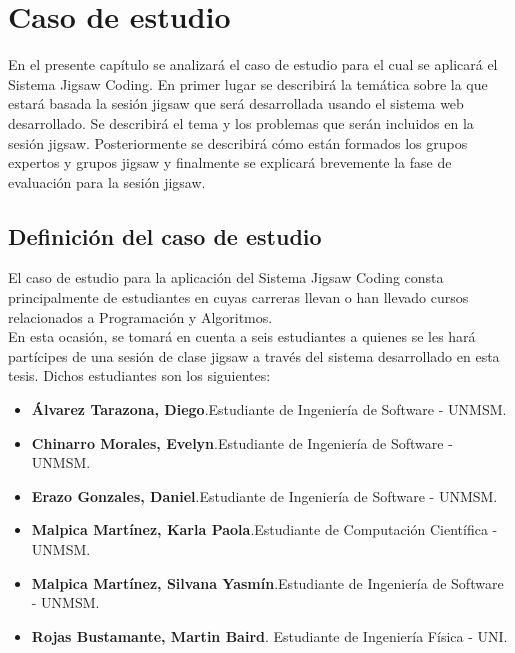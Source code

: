 \chapter{Caso de estudio}
\label{cap:caso_de_estudio}
En el presente capítulo se analizará el caso de estudio para el cual se aplicará el Sistema Jigsaw Coding. En primer lugar se describirá la temática sobre la que estará basada la sesión jigsaw que será desarrollada usando el sistema web desarrollado. Se describirá el tema y los problemas que serán incluidos en la sesión jigsaw. Posteriormente se describirá cómo están formados los grupos expertos y grupos jigsaw y finalmente se explicará brevemente la fase de evaluación para la sesión jigsaw.

\section{Definición del caso de estudio}
El caso de estudio para la aplicación del Sistema Jigsaw Coding consta principalmente de estudiantes en cuyas carreras llevan o han llevado cursos relacionados a Programación y Algoritmos. \\

En esta ocasión, se tomará en cuenta a seis estudiantes a quienes se les hará partícipes de una sesión de clase jigsaw a través del sistema desarrollado en esta tesis. Dichos estudiantes son los siguientes:

\begin{itemize}
	\item \textbf{Álvarez Tarazona, Diego}.\newline Estudiante de Ingeniería de Software - UNMSM.
	\item \textbf{Chinarro Morales, Evelyn}.\newline Estudiante de Ingeniería de Software - UNMSM.
	\item \textbf{Erazo Gonzales, Daniel}.\newline Estudiante de Ingeniería de Software - UNMSM.
	\item \textbf{Malpica Martínez, Karla Paola}.\newline Estudiante de Computación Científica - UNMSM.
	\item \textbf{Malpica Martínez, Silvana Yasmín}.\newline Estudiante de Ingeniería de Software - UNMSM.	
	\item \textbf{Rojas Bustamante, Martin Baird}. \newline Estudiante de Ingeniería Física - UNI.
	
\end{itemize}

